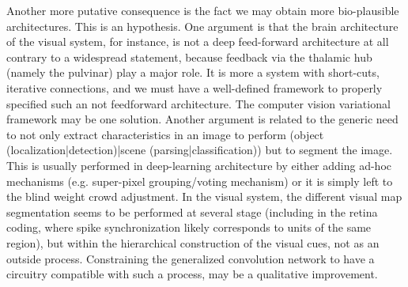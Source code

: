 \documentclass{article}
\begin{document}
Another more putative consequence is the fact we may obtain more bio-plausible architectures. This is an hypothesis. One argument is that the brain architecture of the visual system, for instance, is not a deep feed-forward architecture at all contrary to a widespread statement, because feedback via the thalamic hub (namely the pulvinar) play a major role. It is more a system with short-cuts, iterative connections, and we must have a well-defined framework to properly specified such an not feedforward architecture. The computer vision variational framework may be one solution. Another argument is related to the generic need to not only extract characteristics in an image to perform (object (localization|detection)|scene (parsing|classification)) but to segment the image. This is usually performed in deep-learning architecture by either adding ad-hoc mechanisms (e.g. super-pixel grouping/voting mechanism) or it is simply left to the blind weight crowd adjustment. In the visual system, the different visual map segmentation seems to be performed at several stage (including in the retina coding, where spike synchronization likely corresponds to units of the same region), but within the hierarchical construction of the visual cues, not as an outside process. Constraining the generalized convolution network to have a circuitry compatible with such a process, may be a qualitative improvement.

{\scriptsize  }
\end{document}
